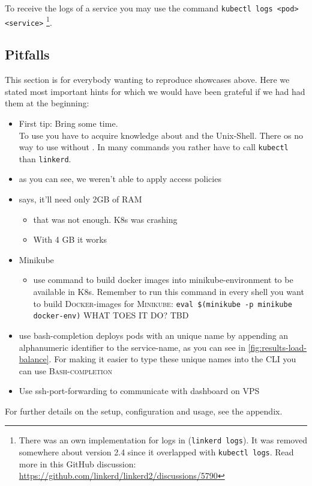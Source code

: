 To receive the logs of a service you may use the \kubernetes{} command \lstinline|kubectl logs <pod> <service>|
	\footnote{
		There was an own implementation for logs in \linkerd{} (\lstinline|linkerd logs|). 
		It was removed somewhere about version 2.4 since it overlapped with \lstinline|kubectl logs|.
		Read more in this GitHub discussion:\\
		\url{https://github.com/linkerd/linkerd2/discussions/5790}
	}.

\subsection{Pitfalls}
This section is for everybody wanting to reproduce showcases above.
Here we stated most important hints for which we would have been grateful if we had had them at the beginning:
\begin{itemize}
	\item First tip: Bring some time.\\
	To use \linkerd{} you have to acquire knowledge about \kubernetes{} and the Unix-Shell.
	There os no way to use \linkerd{} without \kubernetes{}.
	In many commands you rather have to call \lstinline|kubectl| than \lstinline|linkerd|.


	\item as you can see, we weren't able to apply access policies
\end{itemize}
\begin{itemize}
	\item \linkerd{} says, it'll need only 2GB of RAM 
	\begin{itemize}
		\item that was not enough. K8s was crashing
		\item With 4 GB it works
	\end{itemize}

	\item Minikube
	\begin{itemize}
		\item use command to build docker images into minikube-environment to be available in K8s.
		Remember to run this command in every shell you want to build \textsc{Docker}-images for \textsc{Minikube}:
		\lstinline|eval $(minikube -p minikube docker-env)|
		WHAT TOES IT DO? TBD
	\end{itemize}

	\item use bash-completion
	\kubernetes{} deploys pods with an unique name by appending an alphanumeric identifier to the service-name, as you can see in \autoref{fig:results-load-balance}.
	For making it easier to type these unique names into the CLI you can use \textsc{Bash-completion}
	
	\item Use ssh-port-forwarding to communicate with dashboard on VPS	
\end{itemize}

For further details on the setup, configuration and usage, see the appendix.


